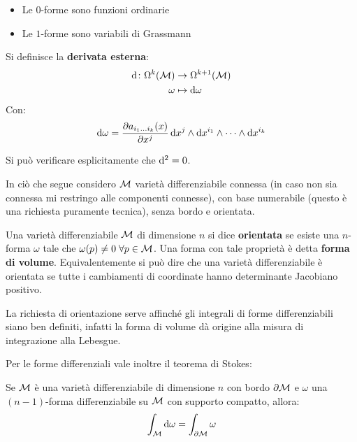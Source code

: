 \begin{example}\hfill
  \begin{itemize}
  \item Le $ 0 $-forme sono funzioni ordinarie
  \item Le $ 1 $-forme sono variabili di Grassmann
  \end{itemize}
\end{example}
\begin{definition}
  Si definisce la \textbf{derivata esterna}:
  \begin{align*}
    \operatorname{d}\!{} \colon \Omega^k(\mathcal{M}) & \to \Omega^{k+1}(\mathcal{M}) \\
    \omega & \mapsto \operatorname{d}\!{\omega}
  \end{align*}
  Con:
  \[
    \operatorname{d}\!{\omega} = \frac{\partial a_{i_1\dots i_k}(x )}{\partial x^j} \operatorname{d}\!{x}^j \wedge \operatorname{d}\!{x}^{i_1} \wedge \dots \wedge \operatorname{d}\!{x}^{i_k}
  \]
\end{definition}
\begin{osservation}
  Si può verificare esplicitamente che $ \operatorname{d}\!{}^2 = 0 $.
\end{osservation}
In ciò che segue considero $ \mathcal{M} $ varietà differenziabile connessa (in caso non
sia connessa mi restringo alle componenti connesse), con base numerabile
(questo è una richiesta puramente tecnica), senza bordo e orientata.
\begin{definition}
  Una varietà differenziabile $ \mathcal{M} $ di dimensione $ n $ si dice
  \textbf{orientata} se esiste una
  $ n $-forma $ \omega $ tale che $ \omega(p) \not= 0 \; \forall p \in \mathcal{M} $. Una forma con tale proprietà
  è detta \textbf{forma di volume}. Equivalentemente si può
  dire che una varietà differenziabile è orientata se tutte i cambiamenti
  di coordinate hanno determinante Jacobiano positivo.
\end{definition}
\begin{osservation}
  La richiesta di orientazione serve affinché gli integrali di forme differenziabili
  siano ben definiti, infatti la forma di volume dà origine alla misura di integrazione
  alla Lebesgue.
\end{osservation}
Per le forme differenziali vale inoltre il teorema di Stokes:
\begin{theorem}
  Se $ \mathcal{M} $ è una varietà differenziabile di dimensione $ n $ con bordo $ \partial \mathcal{M} $
  e $ \omega $ una $ (n-1) $-forma differenziabile su $ \mathcal{M} $ con supporto compatto, allora:
  \[
    \int_{\mathcal{M}} \operatorname{d}\!{\omega} = \int_{\partial \mathcal{M}} \omega
  \]
\end{theorem}
